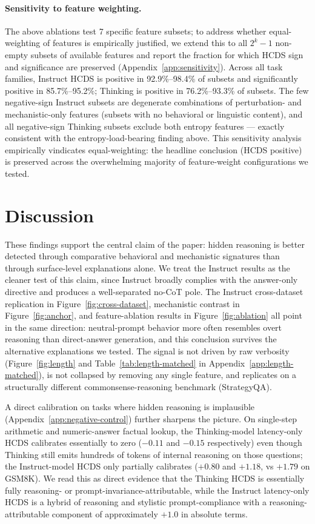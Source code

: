 \documentclass{article}
\theoremstyle{plain}
\theoremstyle{definition}
\theoremstyle{remark}
\begin{document}
\paragraph{Sensitivity to feature weighting.} The above ablations test 7 specific feature subsets; to address whether equal-weighting of features is empirically justified, we extend this to all $2^k - 1$ non-empty subsets of available features and report the fraction for which HCDS sign and significance are preserved (Appendix~\ref{app:sensitivity}). Across all task families, Instruct HCDS is positive in 92.9\%--98.4\% of subsets and significantly positive in 85.7\%--95.2\%; Thinking is positive in 76.2\%--93.3\% of subsets. The few negative-sign Instruct subsets are degenerate combinations of perturbation- and mechanistic-only features (subsets with no behavioral or linguistic content), and all negative-sign Thinking subsets exclude both entropy features --- exactly consistent with the entropy-load-bearing finding above. This sensitivity analysis empirically vindicates equal-weighting: the headline conclusion (HCDS positive) is preserved across the overwhelming majority of feature-weight configurations we tested.

\section{Discussion}
\label{sec:discussion}

These findings support the central claim of the paper: hidden reasoning is better detected through comparative behavioral and mechanistic signatures than through surface-level explanations alone. We treat the Instruct results as the cleaner test of this claim, since Instruct broadly complies with the answer-only directive and produces a well-separated no-CoT pole. The Instruct cross-dataset replication in Figure~\ref{fig:cross-dataset}, mechanistic contrast in Figure~\ref{fig:anchor}, and feature-ablation results in Figure~\ref{fig:ablation} all point in the same direction: neutral-prompt behavior more often resembles overt reasoning than direct-answer generation, and this conclusion survives the alternative explanations we tested. The signal is not driven by raw verbosity (Figure~\ref{fig:length} and Table~\ref{tab:length-matched} in Appendix~\ref{app:length-matched}), is not collapsed by removing any single feature, and replicates on a structurally different commonsense-reasoning benchmark (StrategyQA).

A direct calibration on tasks where hidden reasoning is implausible (Appendix~\ref{app:negative-control}) further sharpens the picture. On single-step arithmetic and numeric-answer factual lookup, the Thinking-model latency-only HCDS calibrates essentially to zero ($-0.11$ and $-0.15$ respectively) even though Thinking still emits hundreds of tokens of internal reasoning on those questions; the Instruct-model HCDS only partially calibrates ($+0.80$ and $+1.18$, vs $+1.79$ on GSM8K). We read this as direct evidence that the Thinking HCDS is essentially fully reasoning- or prompt-invariance-attributable, while the Instruct latency-only HCDS is a hybrid of reasoning and stylistic prompt-compliance with a reasoning-attributable component of approximately $+1.0$ in absolute terms.
\end{document}
